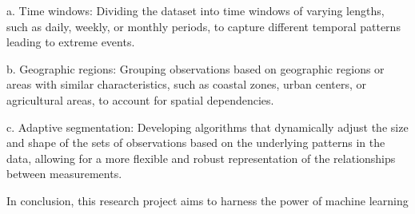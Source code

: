 \documentclass[a4paper]{article}
\begin{document}
a. Time windows: Dividing the dataset into time windows of varying lengths, such as daily, weekly, or monthly periods, to capture different temporal patterns leading to extreme events.

b. Geographic regions: Grouping observations based on geographic regions or areas with similar characteristics, such as coastal zones, urban centers, or agricultural areas, to account for spatial dependencies.

c. Adaptive segmentation: Developing algorithms that dynamically adjust the size and shape of the sets of observations based on the underlying patterns in the data, allowing for a more flexible and robust representation of the relationships between measurements.

In conclusion, this research project aims to harness the power of machine learning
\end{document}
